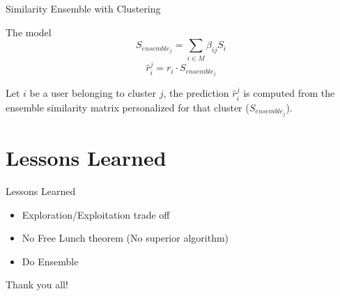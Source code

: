 \documentclass{beamer}
\begin{document}
  \begin{frame}{Similarity Ensemble with Clustering}
  \begin{block}{The model}
  $$
  S_{ensemble_j} = \sum_{i \in M} \beta_{ij} S_i
  $$
  $$
  \hat{r}_i^{j}= r_i \cdot S_{ensemble_j} 
  $$
  \end{block}  
  Let $i$ be a user belonging to cluster $j$, the prediction $\hat{r}_i^{j}$ is computed from the ensemble similarity matrix personalized for that cluster ($S_{ensemble _j}$). 
  \end{frame}
  \section{Lessons Learned}
  \begin{frame}{Lessons Learned}
  \begin{itemize}
  \item Exploration/Exploitation trade off
  \item No Free Lunch theorem (No superior algorithm)
  \item Do Ensemble
  \end{itemize}
  
  \end{frame}
  \begin{frame}[standout]
  Thank you all!
  \end{frame}
\end{document}
